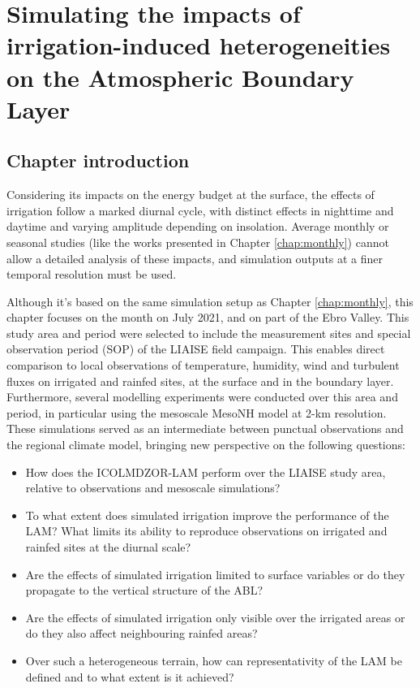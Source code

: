 \chapter{Simulating the impacts of irrigation-induced heterogeneities on the Atmospheric Boundary Layer}
\label{chap:liaise}
\minitoc
\pagebreak

\section{Chapter introduction}

Considering its impacts on the energy budget at the surface, the effects of irrigation follow a marked diurnal cycle, with distinct effects in nighttime and daytime and varying amplitude depending on insolation. Average monthly or seasonal studies (like the works presented in Chapter \ref{chap:monthly}) cannot allow a detailed analysis of these impacts, and simulation outputs at a finer temporal resolution must be used.

Although it's based on the same simulation setup as Chapter \ref{chap:monthly}, this chapter focuses on the month on July 2021, and on part of the Ebro Valley. This study area and period were selected to include the measurement sites and special observation period (SOP) of the LIAISE field campaign. This enables direct comparison to local observations of temperature, humidity, wind and turbulent fluxes on irrigated and rainfed sites, at the surface and in the boundary layer. Furthermore, several modelling experiments were conducted over this area and period, in particular using the mesoscale MesoNH model at 2-km resolution. These simulations served as an intermediate between punctual observations and the regional climate model, bringing new perspective on the following questions:

\begin{itemize}
    \item How does the ICOLMDZOR-LAM perform over the LIAISE study area, relative to observations and mesoscale simulations?
    \item To what extent does simulated irrigation improve the performance of the LAM? What limits its ability to reproduce observations on irrigated and rainfed sites at the diurnal scale?
    \item Are the effects of simulated irrigation limited to surface variables or do they propagate to the vertical structure of the ABL? 
    \item Are the effects of simulated irrigation only visible over the irrigated areas or do they also affect neighbouring rainfed areas?
    \item Over such a heterogeneous terrain, how can representativity of the LAM be defined and to what extent is it achieved?
\end{itemize}

